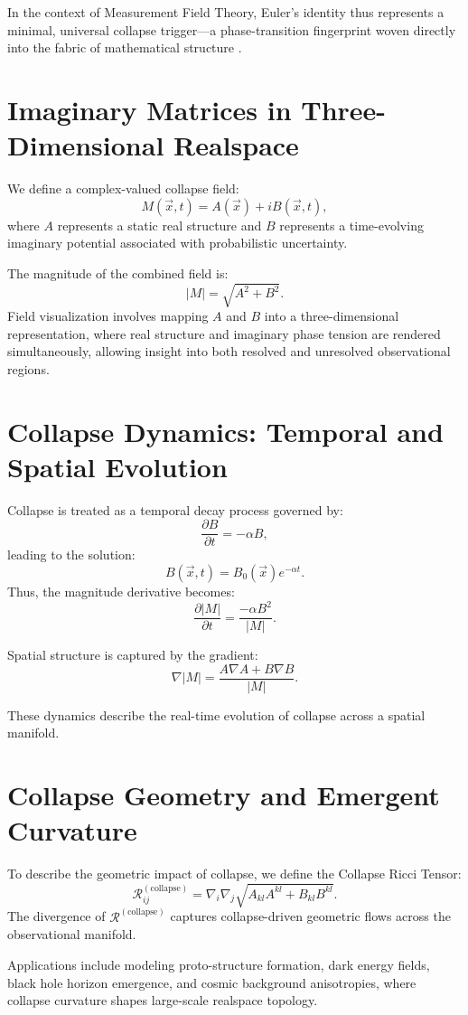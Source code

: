 In the context of Measurement Field Theory, Euler's identity thus represents a minimal, universal collapse trigger---a phase-transition fingerprint woven directly into the fabric of mathematical structure \cite{euler_formula_foundation,dirac1930principles}.

\section{Imaginary Matrices in Three-Dimensional Realspace}
We define a complex-valued collapse field:
\[
M(\vec{x}, t) = A(\vec{x}) + i B(\vec{x}, t),
\]
where $A$ represents a static real structure and $B$ represents a time-evolving imaginary potential associated with probabilistic uncertainty.

The magnitude of the combined field is:
\[
|M| = \sqrt{A^2 + B^2}.
\]
Field visualization involves mapping $A$ and $B$ into a three-dimensional representation, where real structure and imaginary phase tension are rendered simultaneously, allowing insight into both resolved and unresolved observational regions.

\section{Collapse Dynamics: Temporal and Spatial Evolution}
Collapse is treated as a temporal decay process governed by:
\[
\frac{\partial B}{\partial t} = -\alpha B,
\]
leading to the solution:
\[
B(\vec{x}, t) = B_0(\vec{x}) e^{-\alpha t}.
\]
Thus, the magnitude derivative becomes:
\[
\frac{\partial |M|}{\partial t} = \frac{-\alpha B^2}{|M|}.
\]

Spatial structure is captured by the gradient:
\[
\nabla |M| = \frac{A \nabla A + B \nabla B}{|M|}.
\]

These dynamics describe the real-time evolution of collapse across a spatial manifold.


\section{Collapse Geometry and Emergent Curvature}
To describe the geometric impact of collapse, we define the Collapse Ricci Tensor:
\[
\mathcal{R}^{(\text{collapse})}_{ij} = \nabla_i \nabla_j \sqrt{A_{kl}A^{kl} + B_{kl}B^{kl}}.
\]
The divergence of $\mathcal{R}^{(\text{collapse})}$ captures collapse-driven geometric flows across the observational manifold.

Applications include modeling proto-structure formation, dark energy fields, black hole horizon emergence, and cosmic background anisotropies, where collapse curvature shapes large-scale realspace topology.


